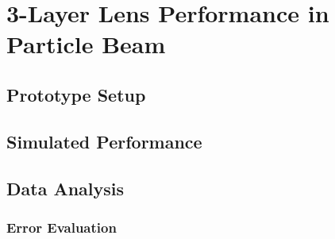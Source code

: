 \chapter{3-Layer Lens Performance in Particle Beam}
\section{Prototype Setup}
\section{Simulated Performance}
\section{Data Analysis}
\subsection{Error Evaluation}
